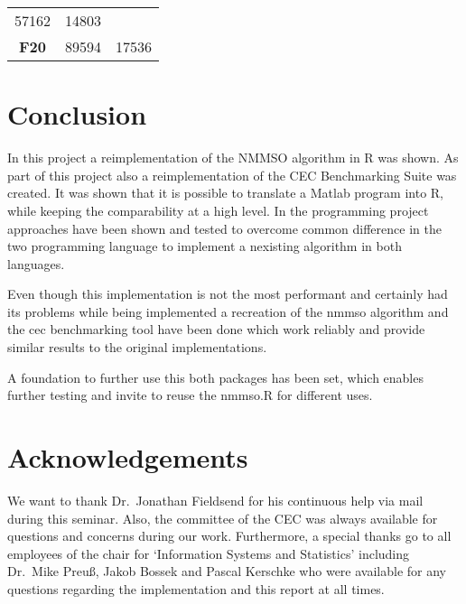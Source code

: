 \documentclass[12pt,a4paper]{article}
\begin{document}
\begin{longtable}[c]{@{}crr@{}}
\begin{minipage}[t]{0.09\columnwidth}\raggedleft\strut
57162
\strut\end{minipage} &
\begin{minipage}[t]{0.25\columnwidth}\raggedleft\strut
14803
\strut\end{minipage}\tabularnewline
\begin{minipage}[t]{0.13\columnwidth}\centering\strut
\textbf{F20}
\strut\end{minipage} &
\begin{minipage}[t]{0.09\columnwidth}\raggedleft\strut
89594
\strut\end{minipage} &
\begin{minipage}[t]{0.25\columnwidth}\raggedleft\strut
17536
\strut\end{minipage}\tabularnewline
\bottomrule
\end{longtable}

\section{Conclusion}\label{conclusion}

In this project a reimplementation of the NMMSO algorithm in R was
shown. As part of this project also a reimplementation of the CEC
Benchmarking Suite was created. It was shown that it is possible to
translate a Matlab program into R, while keeping the comparability at a
high level. In the programming project approaches have been shown and
tested to overcome common difference in the two programming language to
implement a nexisting algorithm in both languages.

Even though this implementation is not the most performant and certainly
had its problems while being implemented a recreation of the nmmso
algorithm and the cec benchmarking tool have been done which work
reliably and provide similar results to the original implementations.

A foundation to further use this both packages has been set, which
enables further testing and invite to reuse the nmmso.R for different
uses.

\section{Acknowledgements}\label{acknowledgements}

We want to thank Dr.~Jonathan Fieldsend for his continuous help via mail
during this seminar. Also, the committee of the CEC was always available
for questions and concerns during our work. Furthermore, a special
thanks go to all employees of the chair for `Information Systems and
Statistics' including Dr.~Mike Preuß, Jakob Bossek and Pascal Kerschke
who were available for any questions regarding the implementation and
this report at all times. \newpage
\end{document}
